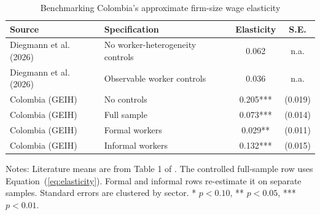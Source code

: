 \begin{table}[htbp]
  \centering
  \caption{Benchmarking Colombia's approximate firm-size wage elasticity}
  \label{tab:firm-size-elasticity-benchmark}
  \small
  \begin{tabular}{p{}p{}cc}
    \toprule
    Source & Specification & Elasticity & S.E. \\
    \midrule
    Diegmann et al. (2026) & No worker-heterogeneity controls & 0.062 & n.a. \\
    Diegmann et al. (2026) & Observable worker controls & 0.036 & n.a. \\
    \midrule
    Colombia (GEIH) & No controls & 0.205*** & (0.019) \\
    Colombia (GEIH) & Full sample & 0.073*** & (0.014) \\
    Colombia (GEIH) & Formal workers & 0.029** & (0.011) \\
    Colombia (GEIH) & Informal workers & 0.132*** & (0.015) \\
    \bottomrule
  \end{tabular}
  \vspace{0.3em}
  \begin{minipage}{0.95\textwidth}
  \footnotesize
  Notes: Literature means are from Table 1 of \citet{DiegmannMullerSchoefer2026}. The controlled full-sample row uses Equation~(\ref{eq:elasticity}). Formal and informal rows re-estimate it on separate samples. Standard errors are clustered by sector. * $p<0.10$, ** $p<0.05$, *** $p<0.01$.
  \end{minipage}
\end{table}
